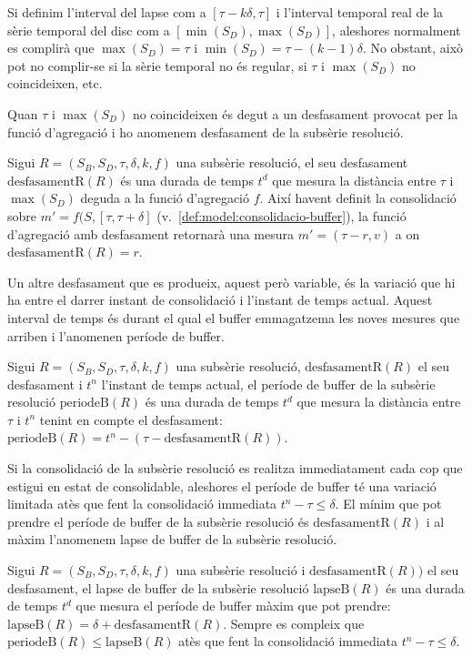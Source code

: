 Si definim l'interval del lapse com a $[\tau - k\delta, \tau]$
i l'interval temporal real de la sèrie temporal del disc com a
$[\min(S_D),\max(S_D)]$, aleshores normalment es complirà que
$\max(S_D)=\tau$ i $\min(S_D)=\tau - (k-1)\delta$. No obstant, això
pot no complir-se si la sèrie temporal no és regular, si $\tau$ i
$\max(S_D)$ no coincideixen, etc. 

Quan $\tau$ i $\max(S_D)$ no coincideixen és degut a un desfasament
provocat per la funció d'agregació i ho anomenem desfasament de la
subsèrie resolució.
\begin{definition} %
  Sigui $R=(S_B,S_D,\tau,\delta,k,f)$ una subsèrie resolució, el seu
  desfasament $\text{desfasamentR}(R)$ és una durada de temps $t^d$
  que mesura la distància entre $\tau$ i $\max(S_D)$ deguda a la
  funció d'agregació $f$. Així havent definit la consolidació sobre
  $m'=f(S,[\tau,\tau+\delta]$
  (v.~\autoref{def:model:consolidacio-buffer}), la funció d'agregació
  amb desfasament retornarà una mesura $m'=(\tau - r,v)$ a on
  $\text{desfasamentR}(R) = r$.
\end{definition}


Un altre desfasament que es produeix, aquest però variable, és la
variació que hi ha entre el darrer instant de consolidació i l'instant
de temps actual. Aquest interval de temps és durant el qual el buffer
emmagatzema les noves mesures que arriben i l'anomenen període de
buffer.
\begin{definition}
  Sigui $R=(S_B,S_D,\tau,\delta,k,f)$ una subsèrie resolució,
  $\text{desfasamentR}(R)$ el seu desfasament i $t^n$ l'instant de
  temps actual, el període de buffer de la subsèrie resolució
  $\text{periodeB}(R)$ és una durada de temps $t^d$ que mesura la
  distància entre $\tau$ i $t^n$ tenint en compte el desfasament:
  $\text{periodeB}(R) = t^n - (\tau - \text{desfasamentR}(R))$.
\end{definition}

Si la consolidació de la subsèrie resolució es realitza immediatament
cada cop que estigui en estat de consolidable, aleshores el període de
buffer té una variació limitada atès que fent la consolidació
immediata $t^n - \tau \leq \delta$. El mínim que pot prendre el
període de buffer de la subsèrie resolució és $\text{desfasamentR}(R)$
i al màxim l'anomenem lapse de buffer de la subsèrie resolució.
\begin{definition}
  Sigui $R=(S_B,S_D,\tau,\delta,k,f)$ una subsèrie resolució i
  $\text{desfasamentR}(R))$ el seu desfasament, el lapse de buffer de
  la subsèrie resolució $\text{lapseB}(R)$ és una durada de temps
  $t^d$ que mesura el període de buffer màxim que pot prendre:
  $\text{lapseB}(R) = \delta + \text{desfasamentR}(R)$.  Sempre es
  compleix que $\text{periodeB}(R) \leq \text{lapseB}(R)$ atès que
  fent la consolidació immediata $t^n - \tau \leq \delta$.
\end{definition}



